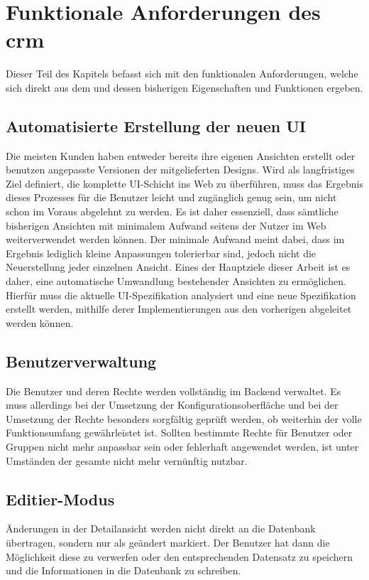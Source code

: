 \section{Funktionale Anforderungen des \acrlong{crm}}
Dieser Teil des Kapitels befasst sich mit den funktionalen Anforderungen, welche sich direkt aus dem  und dessen bisherigen Eigenschaften und Funktionen ergeben.

\subsection{Automatisierte Erstellung der neuen UI}\label{subsec:func_req_automatic_ui_generation}
Die meisten Kunden haben entweder bereits ihre eigenen Ansichten erstellt oder benutzen angepasste Versionen der mitgelieferten Designs. Wird als langfristiges Ziel definiert, die komplette UI-Schicht ins Web zu überführen, muss das Ergebnis dieses Prozesses für die Benutzer leicht und zugänglich genug sein, um nicht schon im Voraus abgelehnt zu werden. Es ist daher essenziell, dass sämtliche bisherigen Ansichten mit minimalem Aufwand seitens der Nutzer im Web weiterverwendet werden können. Der minimale Aufwand meint dabei, dass im Ergebnis lediglich kleine Anpassungen tolerierbar sind, jedoch nicht die Neuerstellung jeder einzelnen Ansicht. Eines der Hauptziele dieser Arbeit ist es daher, eine automatische Umwandlung bestehender Ansichten zu ermöglichen. Hierfür muss die aktuelle UI-Spezifikation analysiert und eine neue Spezifikation erstellt werden, mithilfe derer Implementierungen aus den vorherigen abgeleitet werden können.

\subsection{Benutzerverwaltung}
Die Benutzer und deren Rechte werden vollständig im Backend verwaltet. Es muss allerdings bei der Umsetzung der Konfigurationsoberfläche und bei der Umsetzung der Rechte besonders sorgfältig geprüft werden, ob weiterhin der volle Funktionsumfang gewährleistet ist. Sollten bestimmte Rechte für Benutzer oder Gruppen nicht mehr anpassbar sein  oder fehlerhaft angewendet werden, ist unter Umständen der gesamte  nicht mehr vernünftig nutzbar.

\subsection{Editier-Modus}\label{subsec:func_req_edit_mode}
Änderungen in der Detailansicht werden nicht direkt an die Datenbank übertragen, sondern nur als geändert markiert. Der Benutzer hat dann die Möglichkeit diese zu verwerfen oder den entsprechenden Datensatz zu speichern und die Informationen in die Datenbank zu schreiben.

